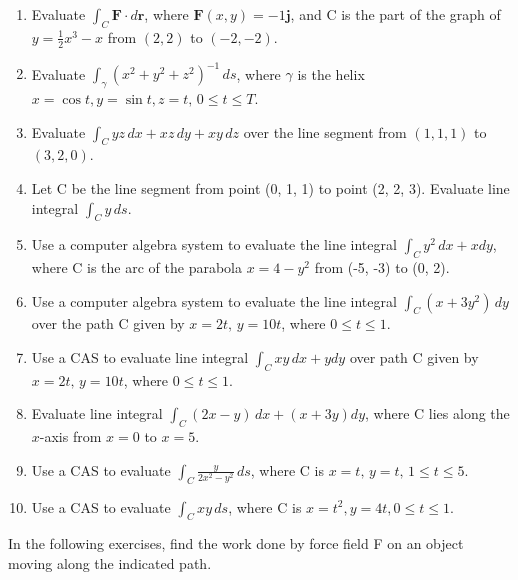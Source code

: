 \documentclass{exercises}
\begin{document}
\begin{enumerate}[resume]
\item Evaluate $\int_{C}\mathbf{F}\cdot d\mathbf{r}$, where $\mathbf{F}(x,y)=-1\mathbf{j}$, and C is the part of the graph of $y=\frac{1}{2}x^{3}-x$ from $(2,2)$ to $(-2,-2)$.
\item Evaluate $\int_{\gamma}^{}{(x^{2}+y^{2}+z^{2})}^{-1}\,ds$, where $\gamma$ is the helix $x=\cos t,y=\sin t,z=t,\,0\le t\le T$.
\item Evaluate $\int_{C}^{}yz\,dx+xz\,dy+xy\,dz$ over the line segment from $(1,1,1)$ to $(3,2,0)$.
\item Let C be the line segment from point (0, 1, 1) to point (2, 2, 3). Evaluate line integral $\int_{C}^{}y\,ds$.
\item \techrequired Use a computer algebra system to evaluate the line integral $\int_{C}y^{2}\,dx+xdy$, where C is the arc of the parabola $x=4-y^{2}$ from (-5, -3) to (0, 2).
\item \techrequired Use a computer algebra system to evaluate the line integral $\int_{C}^{}(x+3y^{2})\,dy$ over the path C given by $x=2t,\,y=10t$, where $0\le t\le1$.
\item \techrequired Use a CAS to evaluate line integral $\int_{C}^{}xy\,dx+ydy$ over path C given by $x=2t,\,y=10t$, where $0\le t\le1$.
\item Evaluate line integral $\int_{C}^{}(2x-y)\,dx+(x+3y)dy$, where C lies along the $x$-axis from $x=0$ to $x=5$.
\item \techrequired Use a CAS to evaluate $\int_{C}^{}\frac{y}{2x^{2}-y^{2}}\,ds$, where C is $x=t,\,y=t,\,1\le t\le5$.
\item \techrequired Use a CAS to evaluate $\int_{C}xy\,ds$, where C is $x=t^{2},y=4t,0\le t\le1$.
\end{enumerate}

In the following exercises, find the work done by force field F on an object moving along the indicated path.
\end{document}
